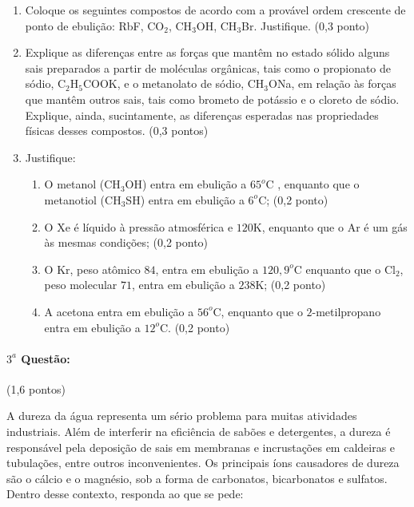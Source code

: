 \documentclass[12pt,a4paper]{article}
\begin{document}
\begin{enumerate}[label=(\alph*)]

\item  Coloque os seguintes compostos de acordo com a provável ordem crescente de ponto de ebulição: RbF, CO$_2$, CH$_3$OH, CH$_3$Br. Justifique.  (0,3 ponto)

\item  Explique as diferenças entre as forças que mantêm no estado sólido alguns sais preparados a partir de moléculas orgânicas, tais como o propionato de sódio, C$_2$H$_5$COOK,  e o metanolato de sódio,   CH$_3$ONa, em relação às forças que mantêm outros sais, tais como brometo de potássio e o cloreto de sódio.  Explique, ainda, sucintamente, as diferenças esperadas nas propriedades físicas desses compostos. (0,3 pontos)

\item Justifique:

\begin{enumerate}[label=(\roman*)]

\item  O metanol (CH$_3$OH) entra em ebulição a $65^o \textrm{C}$ , enquanto que o metanotiol (CH$_3$SH) entra em ebulição a $6^o \textrm{C}$; (0,2 ponto)

\item O Xe é líquido à pressão atmosférica e $120$K, enquanto que o Ar é um gás às mesmas condições; (0,2 ponto)

\item O Kr, peso atômico $84$, entra em ebulição a $120,9^o$C enquanto que o Cl$_2$, peso molecular $71$, entra em ebulição a $238$K; (0,2 ponto) 

\item A acetona entra em ebulição a $56^o$C, enquanto que o $2$-metilpropano entra em ebulição a $12^o$C. (0,2 ponto) 

\end{enumerate}

\end{enumerate}

\paragraph{$3^a$ Questão:} (1,6 pontos)

A dureza da água representa um sério problema para muitas atividades industriais. Além de interferir na eficiência de sabões e detergentes, a dureza é responsável pela deposição de sais em membranas e incrustações em caldeiras e tubulações, entre outros inconvenientes. Os principais íons causadores
de dureza são o cálcio e o magnésio, sob a forma de carbonatos, bicarbonatos e sulfatos. Dentro desse contexto, responda ao que se pede:
\end{document}
